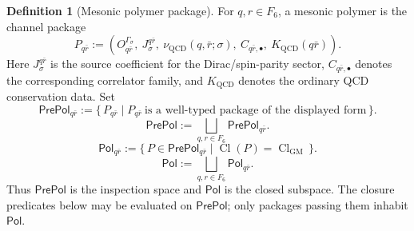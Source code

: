 \documentclass[11pt]{article}
\theoremstyle{definition}
\newtheorem{definition}{Definition}
\theoremstyle{plain}
\DeclareMathOperator{\Cl}{Cl}
\begin{document}
\begin{definition}[Mesonic polymer package]
For \(q,r\in F_6\), a mesonic polymer is the channel package
\[
  P_{q\bar r}
  :=
  (O^{\Gamma_\sigma}_{q\bar r},\ J^{q\bar r}_{\sigma},\
    \nu_{\mathrm{QCD}}(q,\bar r;\sigma),\
    C_{q\bar r,\bullet},\
    K_{\mathrm{QCD}}(q\bar r)).
\]
Here \(J^{q\bar r}_{\sigma}\) is the source coefficient for the
Dirac/spin-parity sector,
\(C_{q\bar r,\bullet}\) denotes the corresponding correlator family, and
\(K_{\mathrm{QCD}}\) denotes the ordinary QCD conservation data.  Set
\[
  \mathsf{PrePol}_{q\bar r}
  :=
  \{\,P_{q\bar r}\mid
  P_{q\bar r}\ \text{is a well-typed package of the displayed form}\,\}.
\]
\[
  \mathsf{PrePol}
  :=
  \bigsqcup_{q,r\in F_6}\mathsf{PrePol}_{q\bar r}.
\]
\[
  \mathsf{Pol}_{q\bar r}
  :=
  \{\,P\in\mathsf{PrePol}_{q\bar r}\mid
    \Cl(P)=\Cl_{\mathrm{GM}}\,\}.
\]
\[
  \mathsf{Pol}
  :=
  \bigsqcup_{q,r\in F_6}\mathsf{Pol}_{q\bar r}.
\]
Thus \(\mathsf{PrePol}\) is the inspection space and \(\mathsf{Pol}\) is
the closed subspace.  The closure predicates below may be evaluated on
\(\mathsf{PrePol}\); only packages passing them inhabit \(\mathsf{Pol}\).
\end{definition}
\end{document}
